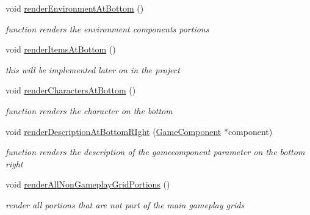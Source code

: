 \begin{DoxyCompactItemize}
void \hyperlink{class_level_editor_af66c9cfd7e8c2da4d1d041e74cf07efa}{render\+Environment\+At\+Bottom} ()
\begin{DoxyCompactList}\small\item\em function renders the environment components portions \end{DoxyCompactList}\item 
\hypertarget{class_level_editor_ae762918c5eadd1f7a701e4e80f5e59dc}{}\label{class_level_editor_ae762918c5eadd1f7a701e4e80f5e59dc} 
void \hyperlink{class_level_editor_ae762918c5eadd1f7a701e4e80f5e59dc}{render\+Items\+At\+Bottom} ()
\begin{DoxyCompactList}\small\item\em this will be implemented later on in the project \end{DoxyCompactList}\item 
\hypertarget{class_level_editor_a1ae72def1752386049f376cf452f3767}{}\label{class_level_editor_a1ae72def1752386049f376cf452f3767} 
void \hyperlink{class_level_editor_a1ae72def1752386049f376cf452f3767}{render\+Characters\+At\+Bottom} ()
\begin{DoxyCompactList}\small\item\em function renders the character on the bottom \end{DoxyCompactList}\item 
\hypertarget{class_level_editor_a626f320f3ff5db609f4b74b1533ac3f7}{}\label{class_level_editor_a626f320f3ff5db609f4b74b1533ac3f7} 
void \hyperlink{class_level_editor_a626f320f3ff5db609f4b74b1533ac3f7}{render\+Description\+At\+Bottom\+R\+Ight} (\hyperlink{class_game_component}{Game\+Component} $\ast$component)
\begin{DoxyCompactList}\small\item\em function renders the description of the gamecomponent parameter on the bottom right \end{DoxyCompactList}\item 
\hypertarget{class_level_editor_a380dda58b5831742e4e66c1004d02778}{}\label{class_level_editor_a380dda58b5831742e4e66c1004d02778} 
void \hyperlink{class_level_editor_a380dda58b5831742e4e66c1004d02778}{render\+All\+Non\+Gameplay\+Grid\+Portions} ()
\begin{DoxyCompactList}\small\item\em render all portions that are not part of the main gameplay grids \end{DoxyCompactList}\item 
\hypertarget{class_level_editor_a663d0553836d7b0d981b6744b7a603d6}{}\label{class_level_editor_a663d0553836d7b0d981b6744b7a603d6} 

\end{DoxyCompactItemize}
